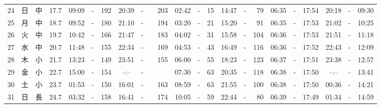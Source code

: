 \documentclass[12pt,a4j]{jsarticle}
\begin{document}
\begin{table}[htbp]
\begin{center}
{\begin{tabular}{|rc|cr|ccrccr|ccrccr|ccc|ccc|}
24 & 日 & 中 & 17.7 &  09:09 &-& 192 &  20:39 &-& 203 &  02:42 &-&  15 &  14:47 &-&  79 & 06:35 & -& 17:54 & 20:18 & -& 09:30 \\
25 & 月 & 中 & 18.7 &  09:52 &-& 180 &  21:10 &-& 194 &  03:20 &-&  21 &  15:20 &-&  91 & 06:35 & -& 17:53 & 21:02 & -& 10:25 \\
26 & 火 & 中 & 19.7 &  10:42 &-& 166 &  21:47 &-& 183 &  04:02 &-&  31 &  15:58 &-& 104 & 06:36 & -& 17:53 & 21:51 & -& 11:18 \\
27 & 水 & 中 & 20.7 &  11:48 &-& 155 &  22:34 &-& 169 &  04:53 &-&  43 &  16:49 &-& 116 & 06:36 & -& 17:52 & 22:43 & -& 12:09 \\
28 & 木 & 小 & 21.7 &  13:23 &-& 149 &  23:51 &-& 155 &  06:00 &-&  55 &  18:23 &-& 123 & 06:37 & -& 17:51 & 23:38 & -& 12:57 \\
29 & 金 & 小 & 22.7 &  15:00 &-& 154 &  --:-- &-&~~~~~ &  07:30 &-&  63 &  20:35 &-& 118 & 06:38 & -& 17:50 & --:-- & -& 13:41 \\
30 & 土 & 小 & 23.7 &  01:53 &-& 150 &  16:01 &-& 163 &  08:59 &-&  63 &  21:55 &-& 100 & 06:38 & -& 17:50 & 00:36 & -& 14:21 \\
31 & 日 & 長 & 24.7 &  03:32 &-& 158 &  16:41 &-& 174 &  10:05 &-&  59 &  22:44 &-&  80 & 06:39 & -& 17:49 & 01:34 & -& 14:59 \\
   \hline
   \end{tabular}}
   \end{center}
\end{table}
\newpage
\end{document}
